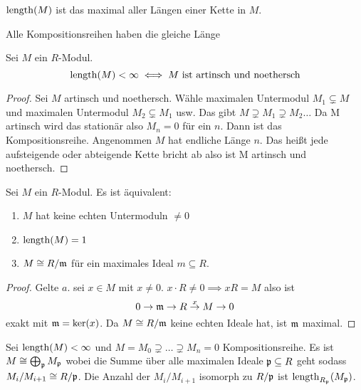 \begin{Kor}
    $\operatorname{length}(M)$ ist das maximal aller Längen einer Kette in $M$.
\end{Kor}
\begin{Kor}
    Alle Kompositionsreihen haben die gleiche Länge
\end{Kor}
\begin{Satz}
    Sei $M$ ein $R$-Modul. 
    $$\operatorname{length}(M)<\infty\iff M\text{ ist artinsch und noethersch}$$
\end{Satz}
\begin{proof}
    Sei $M$ artinsch und noethersch. Wähle maximalen Untermodul $M_1\subsetneq M$ und maximalen Untermodul $M_2\subsetneq M_1$ usw. Das gibt $M\supsetneq M_1\supsetneq M_2\dots$ Da M artinsch wird das stationär also $M_n=0$ für ein $n$. Dann ist das Kompositionsreihe.
    Angenommen $M$ hat endliche Länge $n$. Das heißt jede aufsteigende oder abteigende Kette bricht ab also ist M artinsch und noethersch.
\end{proof}
\begin{Satz}
    Sei $M$ ein $R$-Modul. Es ist äquivalent:
    \begin{enumerate}
        \item $M$ hat keine echten Untermoduln $\neq 0$
        \item $\operatorname{length}(M)=1$
        \item $M\cong R/\mathfrak{m}$ für ein maximales Ideal $m\subseteq R$.
    \end{enumerate}
\end{Satz}
\begin{proof}
    Gelte $a$. sei $x\in M$ mit $x\neq 0$. $x\cdot R\neq 0\implies xR=M$ also ist $$0\to \mathfrak{m}\to R\stackrel x \to M\to 0$$ exakt mit $\mathfrak{m}=\ker(x)$. Da $M\cong R/\mathfrak{m}$ keine echten Ideale hat, ist $\mathfrak{m}$ maximal.
\end{proof}
\begin{Satz}
    Sei $\operatorname{length}(M)<\infty$ und $M=M_0\supsetneq\dots\supsetneq M_n=0$ Kompositionsreihe. Es ist $M\cong \bigoplus_{\mathfrak{p}} M_{\mathfrak{p}}$ wobei die Summe über alle maximalen Ideale $\mathfrak{p}\subseteq R$ geht sodass $M_i/M_{i+1}\cong R/\mathfrak{p}$.
    Die Anzahl der $M_i/M_{i+1}$ isomorph zu $R/\mathfrak{p}$ ist $\operatorname{length}_{R_{\mathfrak{p}}}(M_{\mathfrak{p}})$.
\end{Satz}
